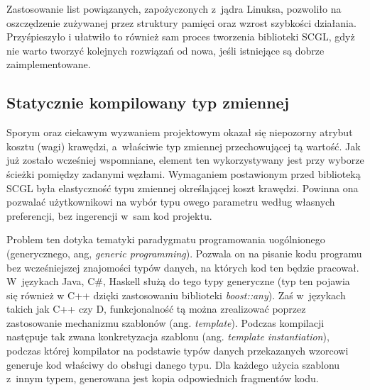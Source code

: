 \documentclass[a4paper,12pt,polish,twoside,openright]{thesis}
\begin{document}
Zastosowanie list powiązanych, zapożyczonych z~jądra Linuksa, pozwoliło na oszczędzenie zużywanej przez struktury pamięci oraz wzrost szybkości działania.
Przyśpieszyło i ułatwiło to również sam proces tworzenia biblioteki SCGL, gdyż nie warto tworzyć kolejnych rozwiązań od nowa, jeśli istniejące są dobrze zaimplementowane.

\subsection{Statycznie kompilowany typ zmiennej}
\label{chap:costtype}
Sporym oraz ciekawym wyzwaniem projektowym okazał się niepozorny atrybut kosztu (wagi) krawędzi, a~właściwie typ zmiennej przechowującej tą wartość.
Jak już zostało wcześniej wspomniane, element ten wykorzystywany jest przy wyborze ścieżki pomiędzy zadanymi węzłami.
Wymaganiem postawionym przed biblioteką SCGL była elastyczność typu zmiennej określającej koszt krawędzi.
Powinna ona pozwalać użytkownikowi na wybór typu owego parametru według własnych preferencji, bez ingerencji w~sam kod projektu.

Problem ten dotyka tematyki paradygmatu programowania uogólnionego (generycznego, ang, \emph{generic programming}).
Pozwala on na pisanie kodu programu bez wcześniejszej znajomości typów danych, na których kod ten będzie pracował.
W~językach Java, C\#, Haskell służą do tego typy generyczne (typ ten pojawia się również w C++ dzięki zastosowaniu biblioteki \emph{boost::any}).
Zaś w~językach takich jak C++ czy D, funkcjonalność tą można zrealizować poprzez zastosowanie mechanizmu szablonów (ang. \emph{template}).
Podczas kompilacji następuje tak zwana konkretyzacja szablonu (ang. \emph{template instantiation}), podczas której kompilator na podstawie typów danych przekazanych wzorcowi generuje kod właściwy do obsługi danego typu.
Dla każdego użycia szablonu z~innym typem, generowana jest kopia odpowiednich fragmentów kodu.
\end{document}
